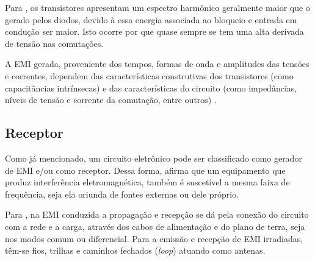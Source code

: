         Para , os transistores apresentam um espectro harmônico geralmente maior que o gerado pelos diodos, devido à essa energia associada ao bloqueio e entrada em condução ser maior. Isto ocorre por que quase sempre se tem uma alta derivada de tensão nas comutações.
        
        A EMI gerada, proveniente dos tempos, formas de onda e amplitudes das tensões e correntes, dependem das características construtivas dos transistores (como capacitâncias intrínsecas) e das características do circuito (como impedâncias, níveis de tensão e corrente da comutação, entre outros) \cite{ref:EMC_phd_schlichting}.
        
        \subsection{Receptor} \label{cap:fund_emc_recep}
        
        Como já mencionado, um circuito eletrônico pode ser classificado como gerador de EMI e/ou como receptor. Dessa forma,  afirma que um equipamento que produz interferência eletromagnética, também é suscetível a mesma faixa de frequência, seja ela oriunda de fontes externas ou dele próprio. 
        
        Para , na EMI conduzida a propagação e recepção se dá pela conexão do circuito com a rede e a carga, através dos cabos de alimentação e do plano de terra, seja nos modos comum ou diferencial. Para a emissão e recepção de EMI irradiadas, têm-se fios, trilhas e caminhos fechados (\textit{loop}) atuando como antenas.
        
        
        
